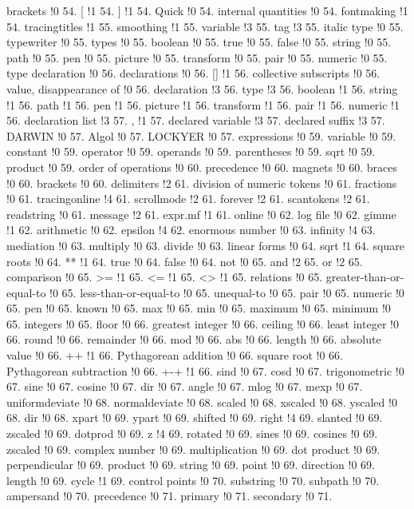 brackets !0 54.
[ !1 54.
] !1 54.
Quick !0 54.
internal quantities !0 54.
fontmaking !1 54.
tracingtitles !1 55.
smoothing !1 55.
variable !3 55.
tag !3 55.
italic type !0 55.
typewriter !0 55.
types !0 55.
boolean !0 55.
true !0 55.
false !0 55.
string !0 55.
path !0 55.
pen !0 55.
picture !0 55.
transform !0 55.
pair !0 55.
numeric !0 55.
type declaration !0 56.
declarations !0 56.
[] !1 56.
collective subscripts !0 56.
value, disappearance of !0 56.
declaration !3 56.
type !3 56.
boolean !1 56.
string !1 56.
path !1 56.
pen !1 56.
picture !1 56.
transform !1 56.
pair !1 56.
numeric !1 56.
declaration list !3 57.
, !1 57.
declared variable !3 57.
declared suffix !3 57.
DARWIN !0 57.
Algol !0 57.
LOCKYER !0 57.
expressions !0 59.
variable !0 59.
constant !0 59.
operator !0 59.
operands !0 59.
parentheses !0 59.
sqrt !0 59.
product !0 59.
order of operations !0 60.
precedence !0 60.
magnets !0 60.
braces !0 60.
brackets !0 60.
delimiters !2 61.
division of numeric tokens !0 61.
fractions !0 61.
tracingonline !4 61.
scrollmode !2 61.
forever !2 61.
scantokens !2 61.
readstring !0 61.
message !2 61.
expr.mf !1 61.
online !0 62.
log file !0 62.
gimme !1 62.
arithmetic !0 62.
epsilon !4 62.
enormous number !0 63.
infinity !4 63.
mediation !0 63.
multiply !0 63.
divide !0 63.
linear forms !0 64.
sqrt !1 64.
square roots !0 64.
** !1 64.
true !0 64.
false !0 64.
not !0 65.
and !2 65.
or !2 65.
comparison !0 65.
>= !1 65.
<= !1 65.
<> !1 65.
relations !0 65.
greater-than-or-equal-to !0 65.
less-than-or-equal-to !0 65.
unequal-to !0 65.
pair !0 65.
numeric !0 65.
pen !0 65.
known !0 65.
max !0 65.
min !0 65.
maximum !0 65.
minimum !0 65.
integers !0 65.
floor !0 66.
greatest integer !0 66.
ceiling !0 66.
least integer !0 66.
round !0 66.
remainder !0 66.
mod !0 66.
abs !0 66.
length !0 66.
absolute value !0 66.
++ !1 66.
Pythagorean addition !0 66.
square root !0 66.
Pythagorean subtraction !0 66.
+-+ !1 66.
sind !0 67.
cosd !0 67.
trigonometric !0 67.
sine !0 67.
cosine !0 67.
dir !0 67.
angle !0 67.
mlog !0 67.
mexp !0 67.
uniformdeviate !0 68.
normaldeviate !0 68.
scaled !0 68.
xscaled !0 68.
yscaled !0 68.
dir !0 68.
xpart !0 69.
ypart !0 69.
shifted !0 69.
right !4 69.
slanted !0 69.
zscaled !0 69.
dotprod !0 69.
z !4 69.
rotated !0 69.
sines !0 69.
cosines !0 69.
zscaled !0 69.
complex number !0 69.
multiplication !0 69.
dot product !0 69.
perpendicular !0 69.
product !0 69.
string !0 69.
point !0 69.
direction !0 69.
length !0 69.
cycle !1 69.
control points !0 70.
substring !0 70.
subpath !0 70.
ampersand !0 70.
precedence !0 71.
primary !0 71.
secondary !0 71.
